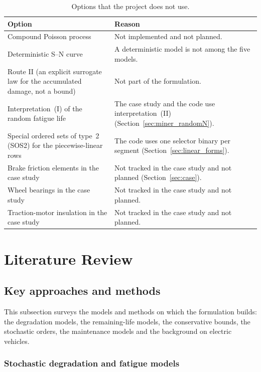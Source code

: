 \documentclass[11pt,a4paper]{article}
\theoremstyle{plain}
\theoremstyle{definition}
\theoremstyle{remark}
\begin{document}
\begin{table}[htbp]
\centering
\caption{Options that the project does not use.}
\label{tab:out_of_scope}
\begin{tabularx}{\linewidth}{@{}>{\hsize=0.717\hsize\raggedright\arraybackslash}X>{\hsize=1.283\hsize\raggedright\arraybackslash}X@{}}
\toprule
\rowcolor{headgrey}
\textbf{Option} & \textbf{Reason} \\
\midrule
Compound Poisson process & Not implemented and not planned. \\
Deterministic S--N curve & A deterministic model is not among the five models. \\
Route II (an explicit surrogate law for the accumulated damage, not a bound) & Not part of the formulation. \\
Interpretation~(I) of the random fatigue life & The case study and the code use interpretation~(II) (Section~\ref{sec:miner_randomN}). \\
Special ordered sets of type~2 (SOS2) for the piecewise-linear rows & The code uses one selector binary per segment (Section~\ref{sec:linear_forms}). \\
Brake friction elements in the case study & Not tracked in the case study and not planned (Section~\ref{sec:case}). \\
Wheel bearings in the case study & Not tracked in the case study and not planned. \\
Traction-motor insulation in the case study & Not tracked in the case study and not planned. \\
\bottomrule
\end{tabularx}
\end{table}

\section{Literature Review}\label{sec:literature}

\subsection{Key approaches and methods}

This subsection surveys the models and methods on which the formulation builds: the degradation models, the remaining-life models, the conservative bounds, the stochastic orders, the maintenance models and the background on electric vehicles.

\subsubsection{Stochastic degradation and fatigue models}
\end{document}
